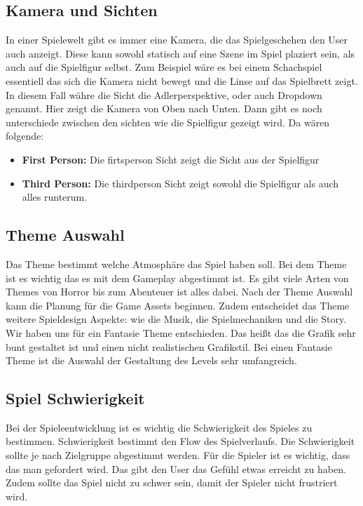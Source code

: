 
\subsection{Kamera und Sichten}
In einer Spielewelt gibt es immer eine Kamera, die das Spielgeschehen den User auch anzeigt. Diese kann sowohl statisch auf eine Szene im Spiel plaziert sein, als auch auf die Spielfigur selbst. Zum Beispiel wäre es bei einem Schachspiel essentiell das sich die Kamera nicht bewegt und die Linse auf das Spielbrett zeigt. In diesem Fall währe die Sicht die Adlerperspektive, oder auch Dropdown genannt. Hier zeigt die Kamera von Oben nach Unten. Dann gibt es noch unterschiede zwischen den sichten wie die Spielfigur gezeigt wird. Da wären folgende:

\begin{itemize}
    \item \textbf{First Person:}
    \noindent Die firtsperson Sicht zeigt die Sicht aus der Spielfigur
    \item \textbf{Third Person:}
    \noindent Die thirdperson Sicht zeigt sowohl die Spielfigur als auch alles runterum. 
\end{itemize}

\subsection{Theme Auswahl}
Das Theme bestimmt welche Atmosphäre das Spiel haben soll. Bei dem Theme ist es wichtig das es mit dem Gameplay abgestimmt ist. Es gibt viele Arten von Themes von Horror bis zum Abenteuer ist alles dabei. Nach der Theme Auswahl kann die Planung für die  Game Assets beginnen. Zudem entscheidet das Theme weitere Spieldesign Aspekte: wie die Musik, die Spielmechaniken und die  Story. Wir haben uns für ein Fantasie Theme entschieden. Das heißt das die Grafik sehr bunt gestaltet ist und einen nicht realistischen Grafikstil. Bei einen Fantasie Theme ist die Auswahl der Gestaltung des Levels sehr umfangreich. 


\subsection{Spiel Schwierigkeit}

Bei der Spieleentwicklung ist es wichtig die Schwierigkeit des Spieles zu bestimmen. Schwierigkeit bestimmt den Flow des Spielverlaufs. Die Schwierigkeit sollte je nach Zielgruppe abgestimmt werden. Für die Spieler ist es wichtig, dass das man gefordert wird. Das gibt den User das Gefühl etwas erreicht zu haben. Zudem sollte das Spiel nicht zu schwer sein, damit der Spieler nicht frustriert wird. 

